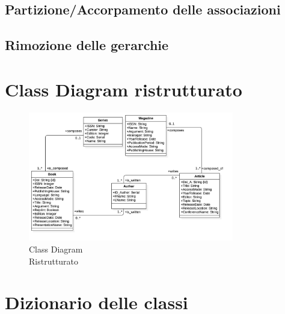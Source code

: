         \subsection{Partizione/Accorpamento delle associazioni}
            
        \subsection{Rimozione delle gerarchie}
    
    \section{Class Diagram ristrutturato}
  
    \begin{figure}

	\centering
	\includegraphics[width=0.8\textwidth]{Immagini/ClassDiagramRIS.png}
	\caption{Class Diagram \\ Ristrutturato}
	\label{fig:ClassDiagramRIS}
	\end{figure}

\newpage
\section{Dizionario delle classi}
	



